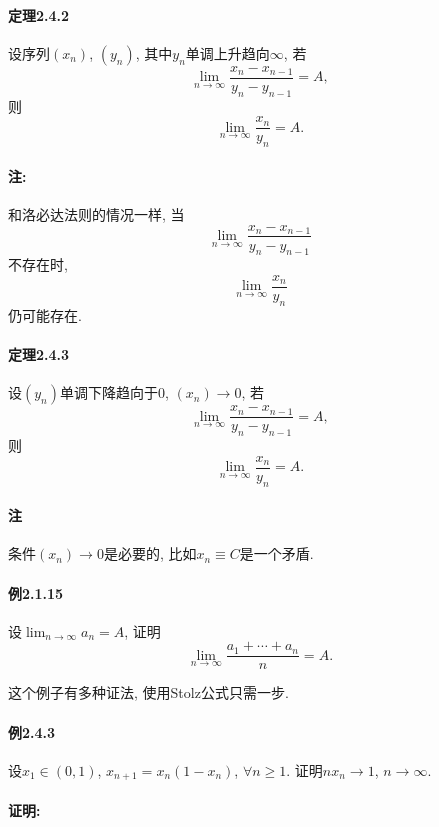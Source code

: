 \paragraph{定理2.4.2}

设序列$(x_{n})$, $(y_{n})$, 其中$y_{n}$单调上升趋向$\infty$, 若
\[
\lim_{n\to\infty}\frac{x_{n}-x_{n-1}}{y_{n}-y_{n-1}}=A,
\]
则
\[
\lim_{n\to\infty}\frac{x_{n}}{y_{n}}=A.
\]


\paragraph{注: }

和洛必达法则的情况一样, 当
\[
\lim_{n\to\infty}\frac{x_{n}-x_{n-1}}{y_{n}-y_{n-1}}
\]
不存在时, 
\[
\lim_{n\to\infty}\frac{x_{n}}{y_{n}}
\]
仍可能存在.

\paragraph{定理2.4.3}

设$\left(y_{n}\right)$单调下降趋向于0, $\left(x_{n}\right)\to0$, 若
\[
\lim_{n\to\infty}\frac{x_{n}-x_{n-1}}{y_{n}-y_{n-1}}=A,
\]
则
\[
\lim_{n\to\infty}\frac{x_{n}}{y_{n}}=A.
\]


\paragraph{注}

条件$\left(x_{n}\right)\to0$是必要的, 比如$x_{n}\equiv C$是一个矛盾.

\paragraph{例2.1.15}

设$\lim_{n\to\infty}a_{n}=A$, 证明
\[
\lim_{n\to\infty}\frac{a_{1}+\cdots+a_{n}}{n}=A.
\]

这个例子有多种证法, 使用Stolz公式只需一步.

\paragraph{例2.4.3}

设$x_{1}\in\left(0,1\right)$, $x_{n+1}=x_{n}(1-x_{n})$, $\forall n\ge1$.
证明$nx_{n}\to1$, $n\to\infty$.

\paragraph{证明:}

